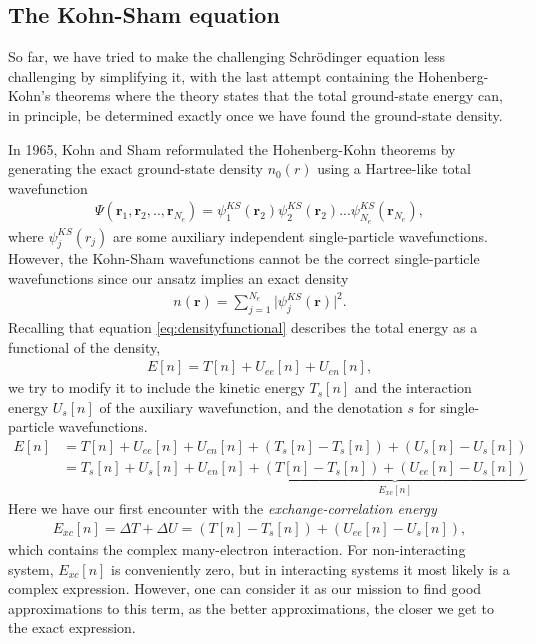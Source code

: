 \subsection{The Kohn-Sham equation}
So far, we have tried to make the challenging Schrödinger equation less challenging by simplifying it, with the last attempt containing the Hohenberg-Kohn's theorems where the theory states that the total ground-state energy can, in principle, be determined exactly once we have found the ground-state density.

In 1965, Kohn and Sham \cite{Kohn1965} reformulated the Hohenberg-Kohn theorems by generating the exact ground-state density $n_0(r)$ using a Hartree-like total wavefunction
\begin{align}
    \Psi(\textbf{r}_1,\textbf{r}_2,..,\textbf{r}_{N_e}) = \psi_1^{KS}(\textbf{r}_2)\psi_2^{KS}(\textbf{r}_2)...\psi_{N_e}^{KS}(\textbf{r}_{N_e}),
\end{align}
where $\psi_j^{KS}(r_j)$ are some auxiliary independent single-particle wavefunctions. However, the Kohn-Sham wavefunctions cannot be the correct single-particle wavefunctions since our ansatz implies an exact density
\begin{align}
  n(\textbf{r}) = \sum_{j=1}^{N_e}\lvert \psi_j^{KS}(\textbf{r})\rvert^2.
\end{align}
Recalling that equation \ref{eq:densityfunctional} describes the total energy as a functional of the density,
\begin{align}
  E[n] = T[n] + U_{ee}[n] + U_{en}[n],
\end{align}
we try to modify it to include the kinetic energy $T_s[n]$ and the interaction energy $U_s[n]$ of the auxiliary wavefunction, and the denotation $s$ for single-particle wavefunctions.
\begin{align*}
  E[n] &= T[n] + U_{ee}[n] + U_{en}[n] + \left( T_s[n] - T_s[n] \right) + \left( U_s[n] - U_s[n] \right) \\
  &= T_s[n] + U_{s}[n] + U_{en}[n] + \underbrace{\left(T[n] - T_s[n] \right) + \left( U_{ee}[n] - U_s[n] \right)}_{E_{xc}[n]}
\end{align*}
Here we have our first encounter with the \textit{exchange-correlation energy}
\begin{align}
  E_{xc}[n] = \Delta T + \Delta U = \left(T[n] - T_s[n] \right) + \left( U_{ee}[n] - U_s[n] \right),
\end{align}
which contains the complex many-electron interaction. For non-interacting system, $E_{xc}[n]$ is conveniently zero, but in interacting systems it most likely is a complex expression. However, one can consider it as our mission to find good approximations to this term, as the better approximations, the closer we get to the exact expression.

